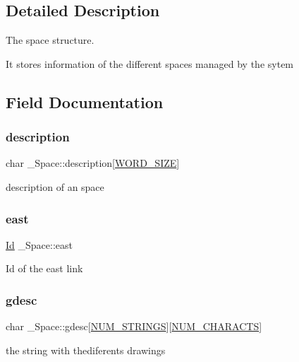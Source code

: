 \subsection{Detailed Description}
The space structure. 

It stores information of the different spaces managed by the sytem 

\subsection{Field Documentation}
\mbox{\label{struct__Space_a2a50aacb78d1d0f65f5b14f94ed81d80}} 
\subsubsection{\texorpdfstring{description}{description}}
{\footnotesize\ttfamily char \+\_\+\+Space\+::description\mbox{[}\hyperlink{types_8h_a92ed8507d1cd2331ad09275c5c4c1c89}{W\+O\+R\+D\+\_\+\+S\+I\+ZE}\mbox{]}}

description of an space \mbox{\label{struct__Space_a41ce2bf33cf0c157b358221f094ee05b}} 
\subsubsection{\texorpdfstring{east}{east}}
{\footnotesize\ttfamily \hyperlink{types_8h_a845e604fb28f7e3d97549da3448149d3}{Id} \+\_\+\+Space\+::east}

Id of the east link \mbox{\label{struct__Space_a0c4d07c615267b6d8744885709ad403d}} 
\subsubsection{\texorpdfstring{gdesc}{gdesc}}
{\footnotesize\ttfamily char \+\_\+\+Space\+::gdesc\mbox{[}\hyperlink{space_8h_a9c6419e7f541d4daf14f5ccd56e03f17}{N\+U\+M\+\_\+\+S\+T\+R\+I\+N\+GS}\mbox{]}\mbox{[}\hyperlink{space_8h_a4f7414c5a72de21b6b45d462410dfc97}{N\+U\+M\+\_\+\+C\+H\+A\+R\+A\+C\+TS}\mbox{]}}

the string with thediferents drawings \mbox{\label{struct__Space_a70cb461deb9ac073e401b607339b567f}} 
